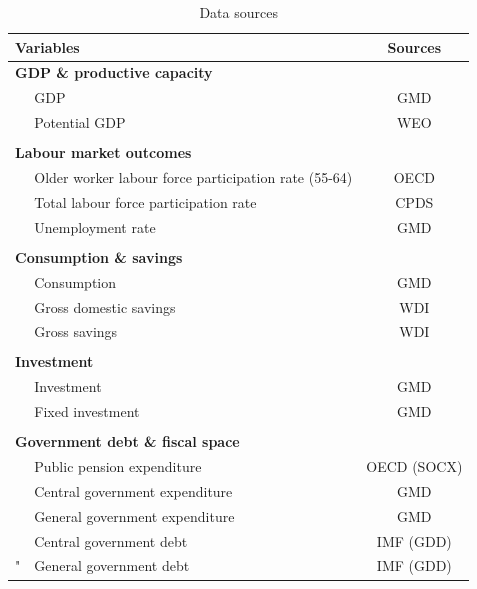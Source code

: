 \documentclass[11pt,english,a4paper, twoside, authoryear]{article}
\begin{document}
\begin{table}[h]
\centering
    \begin{small}
\caption{Data sources}
\vspace{-0.3cm}
    \label{tab:placeholder}
    \begin{tabular}{p{0.2cm} p{10cm} c}

\hline
\multicolumn{2}{l}{Variables}	& Sources \\
\hline


\multicolumn{2}{l}{\textbf{GDP \& productive capacity}} & \\
& GDP & GMD\\
& Potential GDP & WEO\\
& \\[-0.25cm]

\multicolumn{2}{l}{\textbf{Labour market outcomes}} & \\
& Older worker labour force participation rate (55-64) & OECD \\
& Total labour force participation rate & CPDS \\
& Unemployment rate & GMD \\

& \\[-0.25cm]
\multicolumn{2}{l}{\textbf{Consumption \& savings}} \\
& Consumption  & GMD\\
&Gross domestic savings & WDI \\
&Gross savings & WDI \\

& \\[-0.25cm]
\multicolumn{2}{l}{\textbf{Investment}} \\
&Investment  & GMD \\
&Fixed investment  &  GMD \\

& \\[-0.25cm]
\multicolumn{2}{l}{\textbf{Government debt \& fiscal space}} \\
&Public pension expenditure & OECD (SOCX) \\
&Central government expenditure & GMD\\
&General government expenditure & GMD\\
&Central government debt & IMF (GDD) \\"
&General government debt & IMF (GDD) \\


\end{tabular}
\end{small}
\end{table}
\end{document}
